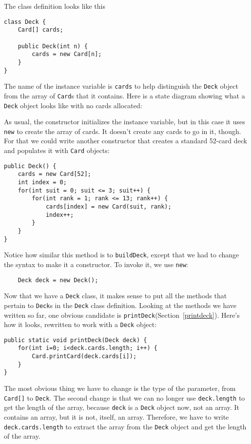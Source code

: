 \documentclass{book}
\newcommand{\beforefig}{\vspace{1.3\parskip}}
\newcommand{\afterfig}{\vspace{-0.2\parskip}}
\newcommand{\myfig}[1]{
    \beforefig
    \centerline{\epsfig{#1,scale=0.8}}
    \afterfig
}
\begin{document}

The class definition looks like this

\begin{verbatim}
class Deck {
    Card[] cards;

    public Deck(int n) {
        cards = new Card[n];
    }
}
\end{verbatim}
%
The name of the instance variable is {\tt cards} to help
distinguish the {\tt Deck} object from the array of {\tt Card}s
that it contains.  Here is a state diagram showing what a
{\tt Deck} object looks like with no cards allocated:


\myfig{figure=figs/deckobject.eps}

As usual, the constructor initializes the instance variable, but in
this case it uses {\tt new} to create the array of cards.
It doesn't create any cards to go in it, though.  For that we could
write another constructor that creates a standard 52-card deck and
populates it with {\tt Card} objects:

\begin{verbatim}
public Deck() {
    cards = new Card[52];
    int index = 0;
    for(int suit = 0; suit <= 3; suit++) {
        for(int rank = 1; rank <= 13; rank++) {
            cards[index] = new Card(suit, rank);
            index++;
        }
    }
}
\end{verbatim}

Notice how similar this method is to {\tt buildDeck}, except
that we had to change the syntax to make it a constructor.
To invoke it, we use {\tt new}:


\begin{verbatim}
    Deck deck = new Deck();
\end{verbatim}
%
Now that we have a {\tt Deck} class, it makes sense to put
all the methods that pertain to {\tt Deck}s in the {\tt Deck}
class definition.  Looking at the methods we have written so
far, one obvious candidate is {\tt printDeck}(Section~\ref{printdeck}).
Here's how it looks, rewritten to work with a {\tt Deck}
object:


\begin{verbatim}
public static void printDeck(Deck deck) {
    for(int i=0; i<deck.cards.length; i++) {
        Card.printCard(deck.cards[i]);
    }
}
\end{verbatim}
%
The most obvious thing we have to change is the type of the parameter,
from {\tt Card[]} to {\tt Deck}.  The second change is that we can no
longer use {\tt deck.length} to get the length of the array, because
{\tt deck} is a {\tt Deck} object now, not an array.  It contains an
array, but it is not, itself, an array.  Therefore, we have to write
{\tt deck.cards.length} to extract the array from the {\tt Deck}
object and get the length of the array.
\end{document}
